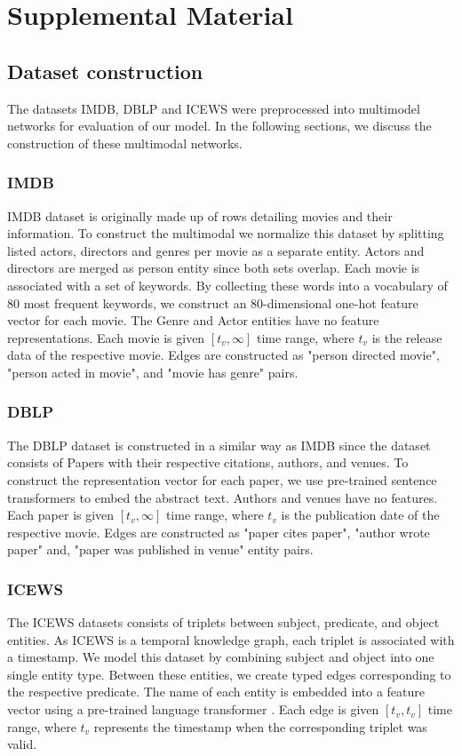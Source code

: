 \chapter{Supplemental Material} \label{sec:supplemental}
\section{Dataset construction}
The datasets IMDB, DBLP and ICEWS were preprocessed into multimodel networks for evaluation of our model.
In the following sections, we discuss the construction of these multimodal networks.

\subsection{IMDB}
IMDB dataset is originally made up of rows detailing movies and their information.
To construct the multimodal we normalize this dataset by splitting listed actors, directors and genres per movie as a separate entity.
Actors and directors are merged as person entity since both sets overlap.
Each movie is associated with a set of keywords. 
By collecting these words into a vocabulary of 80 most frequent keywords, we construct an 80-dimensional one-hot feature vector for each movie.
The Genre and Actor entities have no feature representations.
Each movie is given $[t_v, \infty]$ time range, where $t_v$ is the release data of the respective movie.
Edges are constructed as "person directed movie", "person acted in movie", and "movie has genre" pairs. 

\subsection{DBLP}
The DBLP dataset is constructed in a similar way as IMDB since the dataset consists of Papers with their respective citations, authors, and venues.
To construct the representation vector for each paper, we use pre-trained sentence transformers \cite{wangMiniLMDeepSelfAttention2020} to embed the abstract text.
Authors and venues have no features.
Each paper is given $[t_v, \infty]$ time range, where $t_v$ is the publication date of the respective movie.
Edges are constructed as "paper cites paper", "author wrote paper" and, "paper was published in venue" entity pairs.

\subsection{ICEWS}
The ICEWS datasets consists of triplets between subject, predicate, and object entities.
As ICEWS is a temporal knowledge graph, each triplet is associated with a timestamp.
We model this dataset by combining subject and object into one single entity type.
Between these entities, we create typed edges corresponding to the respective predicate.
The name of each entity is embedded into a feature vector using a pre-trained language transformer \cite{wangMiniLMDeepSelfAttention2020}.
Each edge is given $[t_v, t_v]$ time range, where $t_v$ represents the timestamp when the corresponding triplet was valid.

